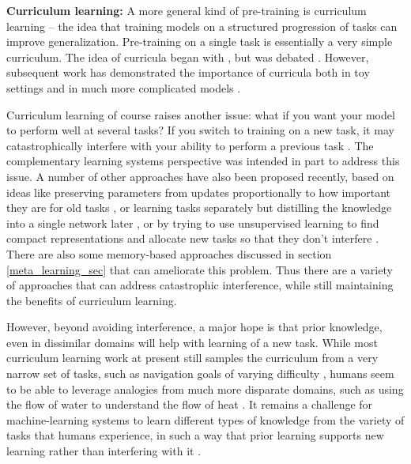 \textbf{Curriculum learning:} A more general kind of pre-training is curriculum learning \citep{Bengio2009} -- the idea that training models on a structured progression of tasks can improve generalization. Pre-training on a single task is essentially a very simple curriculum. The idea of curricula began with \citet{Elman1993}, but was debated \citep[e.g.][]{Rohde1997}. However, subsequent work has demonstrated the importance of curricula both in toy settings \citep{Gulcehre2013} and in much more complicated models \citep[for example][discussed below]{Graves2016}. \par
Curriculum learning of course raises another issue: what if you want your model to perform well at several tasks? If you switch to training on a new task, it may catastrophically interfere with your ability to perform a previous task \citep{McCloskey1989}. The complementary learning systems perspective \citep{McClelland1995, Kumaran2016} was intended in part to address this issue. A number of other approaches have also been proposed recently, based on ideas like preserving parameters from updates proportionally to how important they are for old tasks \citep{Kirkpatrick2016, Zenke2017}, or learning tasks separately but distilling the knowledge into a single network later \citep{Rusu2015}, or by trying to use unsupervised learning to find compact representations and allocate new tasks so that they don't interfere \citep{Achille2018a}. There are also some memory-based approaches discussed in section \ref{meta_learning_sec} that can ameliorate this problem. Thus there are a variety of approaches that can address catastrophic interference, while still maintaining the benefits of curriculum learning. \par
However, beyond avoiding interference, a major hope is that prior knowledge, even in dissimilar domains will help with learning of a new task. While most curriculum learning work at present still samples the curriculum from a very narrow set of tasks, such as navigation goals of varying difficulty \citep{Florensa2018}, humans seem to be able to leverage analogies from much more disparate domains, such as using the flow of water to understand the flow of heat \citep[][see]{Falkenhainer1989}. It remains a challenge for machine-learning systems to learn different types of knowledge from the variety of tasks that humans experience, in such a way that prior learning supports new learning rather than interfering with it \citep{Mitchell2018}. \par 

